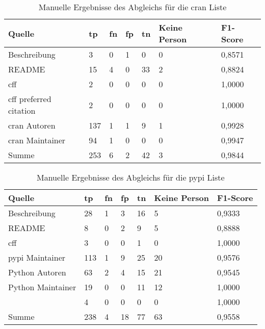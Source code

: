 \begin{table}[H]
    \centering
    \begin{tabularx}{\textwidth}{XR{.7cm}R{.7cm}R{.7cm}R{.7cm}R{2.8cm}R{2cm}}
        \toprule
        \textbf{Quelle} & \textbf{\gls{tp}} & \textbf{\gls{fn}} & \textbf{\gls{fp}} & \textbf{\gls{tn}} & \textbf{Keine Person} & \textbf{F1-Score} \\ \midrule
        Beschreibung                 & 3   & 0 & 1 & 0  & 0 & 0,8571 \\
        README                       & 15  & 4 & 0 & 33 & 2 & 0,8824 \\
        \gls{cff}                    & 2   & 0 & 0 & 0  & 0 & 1,0000 \\
        \gls{cff} preferred citation & 2   & 0 & 0 & 0  & 0 & 1,0000 \\
        \gls{cran} Autoren           & 137 & 1 & 1 & 9  & 1 & 0,9928 \\
        \gls{cran} Maintainer        & 94  & 1 & 0 & 0  & 0 & 0,9947 \\ \midrule
        Summe                        & 253 & 6 & 2 & 42 & 3 & 0,9844 \\
        \bottomrule
    \end{tabularx}
    \caption{Manuelle Ergebnisse des Abgleichs für die \gls{cran} Liste}
    \label{tab:cran_matching_results_manual_anhang}
\end{table}

\begin{table}[H]
    \centering
    \begin{tabularx}{\textwidth}{XR{.7cm}R{.7cm}R{.7cm}R{.7cm}R{2.8cm}R{2cm}}
        \toprule
        \textbf{Quelle} & \textbf{\gls{tp}} & \textbf{\gls{fn}} & \textbf{\gls{fp}} & \textbf{\gls{tn}} & \textbf{Keine Person} & \textbf{F1-Score} \\ \midrule
        Beschreibung                 & 28  & 1 & 3  & 16 & 5  & 0,9333 \\
        README                       & 8   & 0 & 2  & 9  & 5  & 0,8888 \\
        \gls{cff}                    & 3   & 0 & 0  & 1  & 0  & 1,0000 \\
        \gls{pypi} Maintainer        & 113 & 1 & 9  & 25 & 20 & 0,9576 \\
        Python Autoren               & 63  & 2 & 4  & 15 & 21 & 0,9545 \\
        Python Maintainer            & 19  & 0 & 0  & 11 & 12 & 1,0000 \\
                      & 4   & 0 & 0  & 0  & 0  & 1,0000 \\ \midrule
        Summe                        & 238 & 4 & 18 & 77 & 63 & 0,9558 \\
        \bottomrule
    \end{tabularx}
    \caption{Manuelle Ergebnisse des Abgleichs für die \gls{pypi} Liste}
    \label{tab:pypi_matching_results_manual_anhang}
\end{table}

